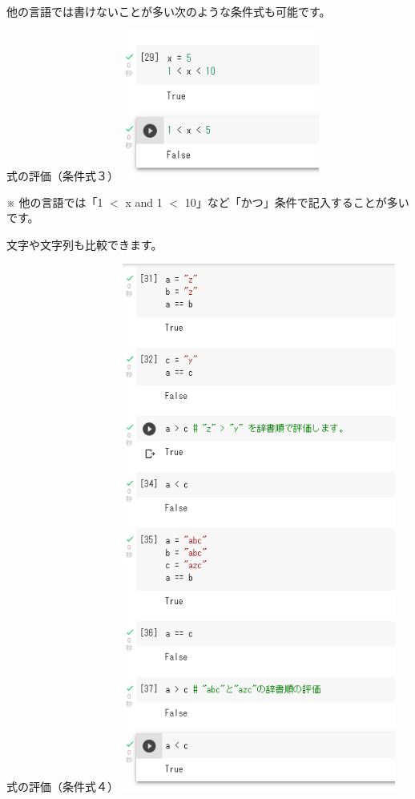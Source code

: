 \documentclass[11pt,a4paper,dvipdfmx,titlepage]{jsreport}
\begin{document}
他の言語では書けないことが多い次のような条件式も可能です。
\begin{grabox}{{式の評価（条件式３）}}
\includegraphics[width=6.5cm]{images/colab14.png}
\end{grabox}
※ 他の言語では「1 $<$ x and 1 $<$ 10」など「かつ」条件で記入することが多いです。

文字や文字列も比較できます。
\begin{grabox}{{式の評価（条件式４）}}
\includegraphics[width=9cm]{images/colab15.png}
\end{grabox}
\end{document}
